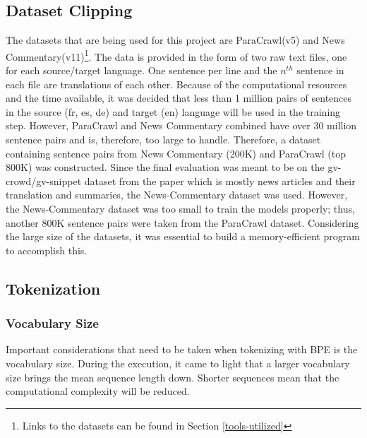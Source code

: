 \documentclass[12pt,a4paper,twoside,openright]{report}
\begin{document}
\subsection{Dataset Clipping}
\label{dataset-clipping}
The datasets that are being used for this project are ParaCrawl(v5) and News Commentary(v11)\footnote{Links to the datasets can be found in Section \ref{tools-utilized} }. The data is provided in the form of two raw text files, one for each source/target language. One sentence per line and the $n^{th}$ sentence in each file are translations of each other. Because of the computational resources and the time available, it was decided that less than 1 million pairs of sentences in the source (fr, es, de) and target (en) language will be used in the training step. However, ParaCrawl and News Commentary combined have over 30 million sentence pairs and is, therefore, too large to handle. Therefore, a dataset containing sentence pairs from News Commentary (200K) and ParaCrawl (top 800K) was constructed. Since the final evaluation was meant to be on the gv-crowd/gv-snippet dataset from the paper \cite{nguyen-daume-iii-2019-global} which is mostly news articles and their translation and summaries, the News-Commentary dataset was used. However, the News-Commentary dataset was too small to train the models properly; thus, another 800K sentence pairs were taken from the ParaCrawl dataset. Considering the large size of the datasets, it was essential to build a memory-efficient program to accomplish this.



\subsection{Tokenization}
\label{tokenization}

\subsubsection{Vocabulary Size}
Important considerations that need to be taken when tokenizing with BPE is the vocabulary size. During the execution, it came to light that a larger vocabulary size brings the mean sequence length down. Shorter sequences mean that the computational complexity will be reduced.
\end{document}
